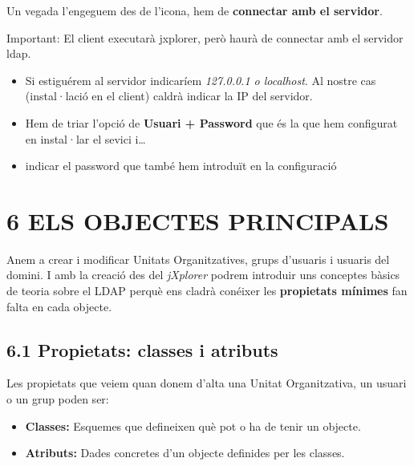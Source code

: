 \documentclass[
  12 pt,
  a4paper,
]{article}
\providecommand{\tightlist}{%
  \setlength{\itemsep}{0pt}\setlength{\parskip}{0pt}}
\begin{document}
Un vegada l'engeguem des de l'icona, hem de \textbf{connectar amb el
servidor}.

Important: El client executarà jxplorer, però haurà de connectar amb el
servidor ldap.

\begin{itemize}
\item
  Si estiguérem al servidor indicaríem \emph{127.0.0.1 o localhost}. Al
  nostre cas (instal·lació en el client) caldrà indicar la IP del
  servidor.
\item
  Hem de triar l'opció de \textbf{Usuari + Password} que és la que hem
  configurat en instal·lar el sevici i\ldots{}
\item
  indicar el password que també hem introduït en la configuració
\end{itemize}

\section{6 ELS OBJECTES PRINCIPALS}\label{els-objectes-principals}

Anem a crear i modificar Unitats Organitzatives, grups d'usuaris i
usuaris del domini. I amb la creació des del \emph{jXplorer} podrem
introduir uns conceptes bàsics de teoria sobre el LDAP perquè ens cladrà
conéixer les \textbf{propietats mínimes} fan falta en cada objecte.

\subsection{6.1 Propietats: classes i
atributs}\label{propietats-classes-i-atributs}

Les propietats que veiem quan donem d'alta una Unitat Organitzativa, un
usuari o un grup poden ser:

\begin{itemize}
\tightlist
\item
  \textbf{Classes:} Esquemes que defineixen què pot o ha de tenir un
  objecte.\\
\item
  \textbf{Atributs:} Dades concretes d'un objecte definides per les
  classes.
\end{itemize}
\end{document}
